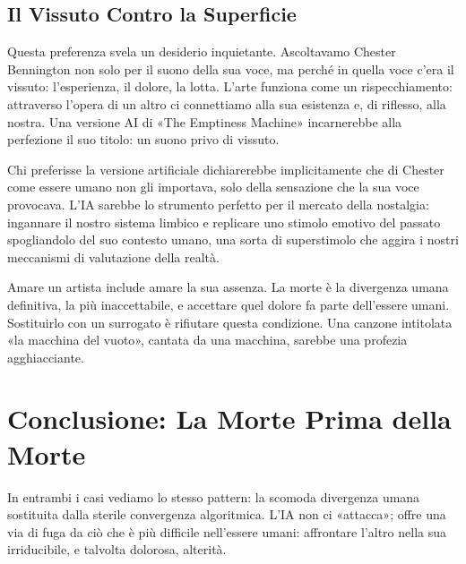 \subsection{Il Vissuto Contro la Superficie}

Questa preferenza svela un desiderio inquietante. Ascoltavamo Chester Bennington non solo per il suono della sua voce, ma perché in quella voce c'era il vissuto: l'esperienza, il dolore, la lotta. L'arte funziona come un rispecchiamento: attraverso l'opera di un altro ci connettiamo alla sua esistenza e, di riflesso, alla nostra. Una versione AI di «The Emptiness Machine» incarnerebbe alla perfezione il suo titolo: un suono privo di vissuto.

Chi preferisse la versione artificiale dichiarerebbe implicitamente che di Chester come essere umano non gli importava, solo della sensazione che la sua voce provocava. L'IA sarebbe lo strumento perfetto per il mercato della nostalgia: ingannare il nostro sistema limbico e replicare uno stimolo emotivo del passato spogliandolo del suo contesto umano, una sorta di superstimolo che aggira i nostri meccanismi di valutazione della realtà.

Amare un artista include amare la sua assenza. La morte è la divergenza umana definitiva, la più inaccettabile, e accettare quel dolore fa parte dell'essere umani. Sostituirlo con un surrogato è rifiutare questa condizione. Una canzone intitolata «la macchina del vuoto», cantata da una macchina, sarebbe una profezia agghiacciante.

\section{Conclusione: La Morte Prima della Morte}

In entrambi i casi vediamo lo stesso pattern: la scomoda divergenza umana sostituita dalla sterile convergenza algoritmica. L'IA non ci «attacca»; offre una via di fuga da ciò che è più difficile nell'essere umani: affrontare l'altro nella sua irriducibile, e talvolta dolorosa, alterità.

